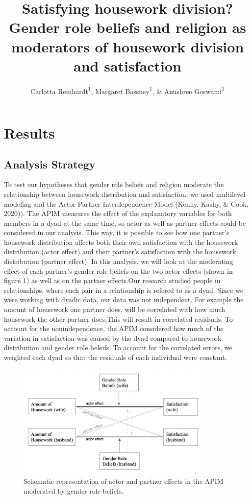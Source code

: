 \documentclass[
  man,floatsintext]{apa6}
\title{Satisfying housework division? Gender role beliefs and religion as moderators of housework division and satisfaction}
\author{Carlotta Reinhardt\textsuperscript{1}, Margaret Bassney\textsuperscript{1}, \& Anushree Goswami\textsuperscript{1}}
\date{}
\affiliation{\vspace{0.5cm}\textsuperscript{1} Smith College}
\begin{document}
\maketitle

\hypertarget{results}{%
\section{Results}\label{results}}

\hypertarget{analysis-strategy}{%
\subsection{Analysis Strategy}\label{analysis-strategy}}

To test our hypotheses that gender role beliefs and religion moderate the relationship between housework distribution and satisfaction, we used multilevel modeling and the Actor-Partner Interdependence Model (Kenny, Kashy, \& Cook, 2020)). The APIM measures the effect of the explanatory variables for both members in a dyad at the same time, so actor as well as partner effects could be considered in our analysis. This way, it is possible to see how one partner's housework distribution affects both their own satisfaction with the housework distribution (actor effect) and their partner's satisfaction with the housework distribution (partner effect). In this analysis, we will look at the moderating effect of each partner's gender role beliefs on the two actor effects (shown in figure 1) as well as on the partner effects.Our research studied people in relationships, where each pair in a relationship is refered to as a dyad. Since we were working with dyadic data, our data was not independent. For example the amount of housework one partner does, will be correlated with how much housework the other partner does.This will result in correlated residuals. To account for the nonindependence, the APIM considered how much of the variation in satisfaction was caused by the dyad compared to housework distribution and gender role beleifs. To account for the correlated errors, we weighted each dyad so that the residuals of each individual were constant.



\begin{figure}
\includegraphics[width=3.83in]{APIM} \caption{Schematic representation of actor and partner effects in the APIM moderated by gender role beliefs.}\label{fig:unnamed-chunk-3}
\end{figure}
\end{document}
